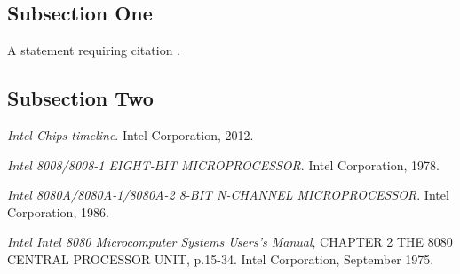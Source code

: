 \documentclass[twoside,twocolumn]{article}
\begin{document}
\subsection{Subsection One}

A statement requiring citation \cite{Figueredo:2009dg}.
\blindtext %

\subsection{Subsection Two}

\blindtext %


\begin{thebibliography}{99} %

\textit{Intel Chips timeline}.
Intel Corporation, 2012.

\textit{Intel 8008/8008-1 EIGHT-BIT MICROPROCESSOR}.
Intel Corporation, 1978.

\textit{Intel 8080A/8080A-1/8080A-2 8-BIT N-CHANNEL MICROPROCESSOR}.
Intel Corporation, 1986.

\textit{Intel Intel 8080 Microcomputer Systems Users's Manual}, CHAPTER 2 THE 8080 CENTRAL PROCESSOR UNIT, p.15-34.
Intel Corporation, September 1975.

\end{thebibliography}

\end{document}
